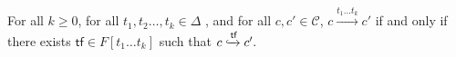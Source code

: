 \documentclass[10pt,a4paper]{article}
\let\mathbb\mathds
\renewcommand{\geq}{\geqslant}
\newcommand{\nats}{\mathbb{N}}
\newcommand{\step}[1]{\xrightarrow{#1}}
\newcommand{\transitions}{\Delta}
\newcommand*{\states}{Q}
\newcommand*{\atrans}{t}
\newcommand{\prodconfigs}{\mathcal{C}}
\newcommand{\prodconfig}{c}
\newcommand*{\dummysymb}{\#}
\newcommand*{\natsanddummy}{\nats_{\dummysymb}}
\newcommand*{\transfersof}[1]{F[#1]}
\newcommand*{\atf}{\mathsf{tf}}
\newcommand*{\tftimes}{\otimes}
\newcommand*{\flowstep}[1]{\xhookrightarrow{#1}}
\begin{document}
\begin{lemmarep}
	\label{sequence-transitions-product-tf}
	For all \(k \geq 0\), for all \(\atrans_1, \atrans_2 \dots, \atrans_k \in \transitions\) , and for all \(\prodconfig, \prodconfig' \in \prodconfigs\), \(\prodconfig \step{\atrans_1 \dots \atrans_k} \prodconfig' \) if and only if there exists \(\atf \in \transfersof{\atrans_1 \dots \atrans_k}\) such that \( \prodconfig \flowstep{\atf} \prodconfig'.
	\)
\end{lemmarep}
\end{document}
